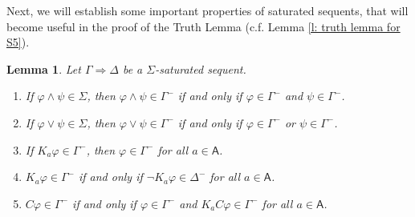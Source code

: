 \documentclass{myifcolog}
\newcommand\C {C}
\newcommand{\K}{K}
\newcommand\A{\mathsf{A}}
\newcommand{\agi}{a}
\newtheorem{lemma}[theorem]{Lemma}
\numberwithin{theorem}{section}
\begin{document}
Next, we will establish some important properties of saturated sequents, that will become useful in the proof of the Truth Lemma (c.f. Lemma \ref{l: truth lemma for S5}).


\begin{lemma}\label{l: properties of saturated sequents}
    Let $\Gamma \Rightarrow \Delta$ be a $\Sigma$-saturated sequent. 
    \begin{enumerate}
        \item If $\varphi \wedge \psi \in \Sigma$, then $\varphi \wedge \psi \in \Gamma^-$ if and only if $\varphi \in \Gamma^-$ and $\psi \in \Gamma^-$. 
        \item If $\varphi \vee \psi \in \Sigma$, then $\varphi \vee \psi \in \Gamma^-$ if and only if $\varphi \in \Gamma^-$ or $\psi \in \Gamma^-$.
        \item If $\K_\agi \varphi \in \Gamma^-$, then $\varphi \in \Gamma^-$ for all $\agi \in \A$.
        \item $\K_\agi \varphi \in \Gamma^-$ if and only if $\neg \K_\agi \varphi \in \Delta^-$ for all $\agi \in \A$.
        \item $\C \varphi \in \Gamma^-$ if and only if $\varphi \in \Gamma^-$ and $\K_\agi \C \varphi \in \Gamma^-$ for all $\agi \in \A$.
    \end{enumerate}
\end{lemma}
\end{document}
